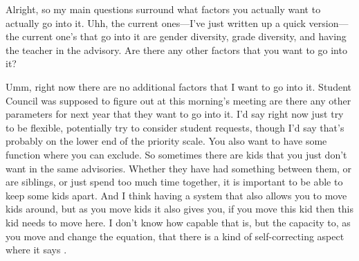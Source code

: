 \documentclass[appendix.tex]{subfiles}
\begin{document}
Alright, so my main questions surround what factors you actually want to actually go into it.
Uhh, the current ones---I've just written up a quick version---the current one's that go into it are gender diversity, grade diversity, and having the teacher in the advisory.
Are there any other factors that you want to go into it?

Umm, right now there are no additional factors that I want to go into it.
Student Council was supposed to figure out at this morning's meeting are there any other parameters for next year that they want to go into it.
I'd say right now just try to be flexible, potentially try to consider student requests, though I'd say that's probably on the lower end of the priority scale.
You also want to have some function where you can exclude.
So sometimes there are kids that you just don't want in the same advisories.
Whether they have had something between them, or are siblings, or just spend too much time together, it is important to be able to keep some kids apart.
And I think having a system that also allows you to move kids around, but as you move kids it also gives you, if you move this kid then this kid needs to move here.
I don't know how capable that is, but the capacity to, as you move and change the equation, that there is a kind of self-correcting aspect where it says .
\end{document}
